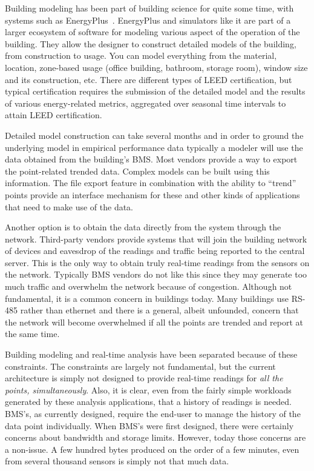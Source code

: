 Building modeling has been part of building science for quite some time, with systems such as EnergyPlus~\cite{EnergyPlus}.
EnergyPlus and simulators like it are part of a larger ecosystem of software for modeling various aspect of the operation
of the building.  They allow the designer to construct detailed models of the building, from construction to usage.  You can
model everything from the material, location, zone-based usage (office building, bathroom, storage room), window size and its
construction, etc.  There are different types of LEED certification, but typical certification requires the submission of the detailed
model and the results of various energy-related metrics, aggregated over seasonal time intervals to attain LEED certification.

Detailed model construction can take several months and in order to ground the underlying model in empirical performance data
typically a modeler will use the data obtained from the building's BMS.  Most vendors provide a way to export the point-related 
trended data.  Complex models can be built using this information.  The file export feature in combination with the ability to 
``trend'' points provide an interface mechanism for these and other kinds of applications that need to make use of the data.

Another option is to obtain the data directly from the system through the network.  Third-party vendors provide systems that 
will join the building network of devices and eavesdrop of the readings and traffic being reported to the central server.
This is the only way to obtain truly real-time readings from the sensors on the network.
Typically BMS vendors do not like this since they may generate too much traffic and overwhelm the network because of congestion.
Although not fundamental, it is a common concern in buildings today.  Many buildings use RS-485 rather than ethernet and there is
a general, albeit unfounded, concern that the network will become overwhelmed if all the points are trended and report at the same
time.

Building modeling and real-time analysis have been separated because of these constraints.  The constraints are largely not
fundamental, but the current architecture is simply not designed to provide real-time readings for \emph{all the points, simultaneously}.
Also, it is clear, even from the fairly simple workloads generated by these analysis applications, that a history of readings
is needed.  BMS's, as currently designed, require the end-user to manage the history of the data point individually.
When BMS's were first designed, there were certainly concerns about bandwidth and storage limits.  However, today those concerns
are a non-issue.  A few hundred bytes produced on the order of a few minutes, even from several thousand sensors is simply not
that much data.


